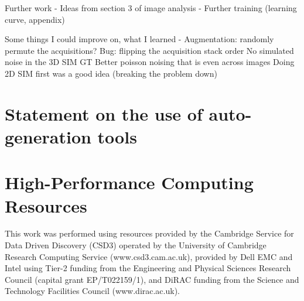 \documentclass[12pt]{article}
\begin{document}
Further work
- Ideas from section 3 of image analysis
- Further training (learning curve, appendix)

Some things I could improve on, what I learned
- Augmentation: randomly permute the acquisitions?
    Bug: flipping the acquisition stack order
    No simulated noise in the 3D SIM GT
    Better poisson noising that is even across images
    Doing 2D SIM first was a good idea (breaking the problem down)




\appendix

\section{Statement on the use of auto-generation tools}

\section {High-Performance Computing Resources}

This work was performed using resources provided by the Cambridge Service for Data Driven Discovery (CSD3) operated by the University of Cambridge Research Computing Service (www.csd3.cam.ac.uk),
provided by Dell EMC and Intel using Tier-2 funding from the Engineering and Physical Sciences Research Council (capital grant EP/T022159/1),
and DiRAC funding from the Science and Technology Facilities Council (www.dirac.ac.uk).
\end{document}
